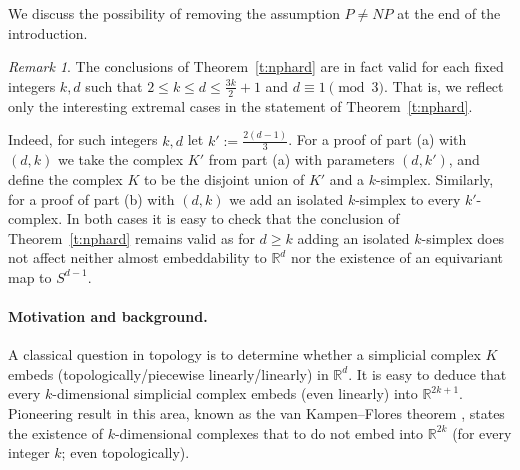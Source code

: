 \documentclass[runningheads]{llncs}
\theoremstyle{remark}
\newtheorem*{remark*}{Remark}
\theoremstyle{definition}
\newcommand{\R}{\mathbb{R}}
\begin{document}
We discuss the possibility of removing the assumption $P\ne NP$
at the end of the introduction.

\begin{remark*}
The conclusions of Theorem~\ref{t:nphard} are in fact valid for each fixed integers $k,d$ such that
$2\le k\le d\le \frac{3k}2+1$ and $d\equiv 1 \pmod 3$.
That is, we reflect only the interesting extremal cases in the statement of Theorem~\ref{t:nphard}.

Indeed, for such integers $k,d$ let $k' := \frac{2(d-1)}3$.
For a proof of  part (a) with $(d, k)$ we take the complex $K'$ from part (a) with parameters $(d,k')$, and define
the complex $K$ to be the disjoint union of $K'$ and a $k$-simplex.
Similarly, for a proof of  part (b) with $(d, k)$ we add an isolated $k$-simplex to every $k'$-complex.
In both cases it is easy to check that the conclusion of Theorem~\ref{t:nphard} remains valid as for $d\ge k$ adding an isolated $k$-simplex does not affect neither almost embeddability to $\R^d$ nor the existence
of an equivariant map to $S^{d-1}$.
\end{remark*}

\paragraph{Motivation and background.}
A classical question in topology is to determine whether a simplicial complex $K$ embeds (topologically/piecewise linearly/linearly) in $\R^d$.
It is easy to deduce that every $k$-dimensional simplicial complex embeds (even
  linearly) into $\R^{2k+1}$.  Pioneering result in this area, known as the van
  Kampen--Flores theorem \cite{VK, Fl32, Sk14}, states the existence of
  $k$-dimensional complexes that to do not embed into $\R^{2k}$ (for every
  integer $k$; even topologically).
\end{document}
